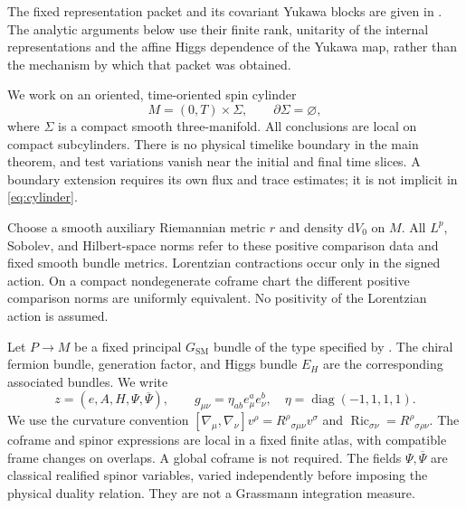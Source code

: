 \documentclass[11pt]{article}
\numberwithin{equation}{section}
\theoremstyle{definition}
\theoremstyle{remark}
\newcommand{\dd}{\mathrm d}
\newcommand{\diag}{\operatorname{diag}}
\newcommand{\Ric}{\operatorname{Ric}}
\newcommand{\bPsi}{\overline\Psi}
\newcommand{\dV}{\dd V}
\begin{document}
The fixed representation packet and its covariant Yukawa blocks are given
in . The analytic arguments below
use their finite rank, unitarity of the internal representations and the
affine Higgs dependence of the Yukawa map, rather than the mechanism by
which that packet was obtained.

We work on an oriented, time-oriented spin cylinder
\begin{equation}
 M=(0,T)\times\Sigma,
 \qquad \partial\Sigma=\varnothing,
 \label{eq:cylinder}
\end{equation}
where $\Sigma$ is a compact smooth three-manifold. All conclusions are local on compact subcylinders. There is no physical timelike boundary in the main theorem, and test variations vanish near the initial and final time slices. A boundary extension requires its own flux and trace estimates; it is not implicit in \eqref{eq:cylinder}.

Choose a smooth auxiliary Riemannian metric $r$ and density $\dV_0$ on $M$. All $L^p$, Sobolev, and Hilbert-space norms refer to these positive comparison data and fixed smooth bundle metrics. Lorentzian contractions occur only in the signed action. On a compact nondegenerate coframe chart the different positive comparison norms are uniformly equivalent. No positivity of the Lorentzian action is assumed.

Let $P\to M$ be a fixed principal $G_{\mathrm{SM}}$ bundle of the type specified by . The chiral fermion bundle, generation factor, and Higgs bundle $E_H$ are the corresponding associated bundles. We write
\begin{equation}
 z=(e,A,H,\Psi,\bPsi),\qquad
 g_{\mu\nu}=\eta_{ab}e^a_\mu e^b_\nu,
 \quad \eta=\diag(-1,1,1,1).
 \label{eq:fields}
\end{equation}
We use the curvature convention $[\nabla_\mu,\nabla_\nu]v^\rho=R^\rho{}_{\sigma\mu\nu}v^\sigma$ and $\Ric_{\sigma\nu}=R^\rho{}_{\sigma\rho\nu}$. The coframe and spinor expressions are local in a fixed finite atlas, with compatible frame changes on overlaps. A global coframe is not required. The fields $\Psi,\bPsi$ are classical realified spinor variables, varied independently before imposing the physical duality relation. They are not a Grassmann integration measure.
\end{document}
